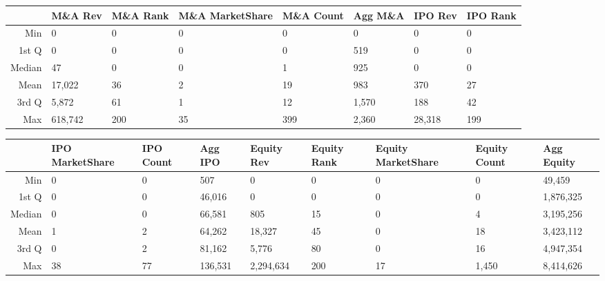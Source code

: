 \documentclass{article}
\begin{document}
\begin{table}[H]
\centering
\begin{tabular}{rlllllll}
  \hline
 & M\&A Rev & M\&A  Rank & M\&A MarketShare & M\&A Count & Agg M\&A  & IPO Rev & IPO  Rank \\ 
  \hline
Min & 0 & 0 & 0 & 0 & 0 & 0 & 0 \\ 
  1st Q & 0 & 0 & 0 & 0 & 519 & 0 & 0 \\ 
  Median & 47 & 0 & 0 & 1 & 925 & 0 & 0 \\ 
  Mean & 17,022 & 36 & 2 & 19 & 983 & 370 & 27 \\ 
  3rd Q & 5,872 & 61 & 1 & 12 & 1,570 & 188 & 42 \\ 
  Max & 618,742 & 200 & 35 & 399 & 2,360 & 28,318 & 199 \\ 
   \hline
\end{tabular}
\end{table}
\begin{table}[H]
\centering
\begin{tabular}{rllllllll}
  \hline
 & IPO MarketShare & IPO Count & Agg IPO  & Equity Rev & Equity  Rank & Equity MarketShare & Equity Count & Agg Equity  \\ 
  \hline
Min & 0 & 0 & 507 & 0 & 0 & 0 & 0 & 49,459 \\ 
  1st Q & 0 & 0 & 46,016 & 0 & 0 & 0 & 0 & 1,876,325 \\ 
  Median & 0 & 0 & 66,581 & 805 & 15 & 0 & 4 & 3,195,256 \\ 
  Mean & 1 & 2 & 64,262 & 18,327 & 45 & 0 & 18 & 3,423,112 \\ 
  3rd Q & 0 & 2 & 81,162 & 5,776 & 80 & 0 & 16 & 4,947,354 \\ 
  Max & 38 & 77 & 136,531 & 2,294,634 & 200 & 17 & 1,450 & 8,414,626 \\ 
   \hline
\end{tabular}
\end{table}

\newpage
\end{document}
